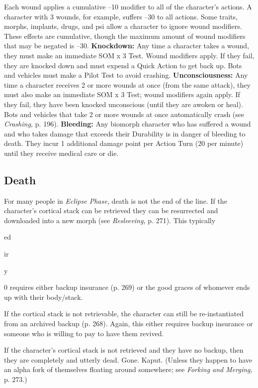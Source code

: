 Each wound applies a cumulative –10 modifier to all 
of the character's actions. A character with 3 wounds, 
for example, suffers –30 to all actions.
Some traits, morphs, implants, drugs, and psi allow 
a character to ignore wound modifiers. These effects 
are cumulative, though the maximum amount of 
wound modifiers that may be negated is –30.
\textbf{Knockdown:} Any time a character takes a wound, 
they must make an immediate SOM x 3 Test. Wound 
modifiers apply. If they fail, they are knocked down 
and must expend a Quick Action to get back up. Bots 
and vehicles must make a Pilot Test to avoid crashing.
\textbf{Unconsciousness:} Any time a character receives 2 
or more wounds at once (from the same attack), they 
must also make an immediate SOM x 3 Test; wound 
modifiers again apply. If they fail, they have been 
knocked unconscious (until they are awoken or heal). 
Bots and vehicles that take 2 or more wounds at once 
automatically crash (see \textit{Crashing,} p. 196).
\textbf{Bleeding:} Any biomorph character who has suffered 
a wound and who takes damage that exceeds their 
Durability is in danger of bleeding to death. They 
incur 1 additional damage point per Action Turn (20 
per minute) until they receive medical care or die.

\subsection{Death}

For many people in \textit{Eclipse Phase,} death is not the end 
of the line. If the character's cortical stack can be retrieved
they can be resurrected and downloaded into
a new morph (see \textit{Resleeving,} p. 271). This typically 

ed

ir 

y

0
requires either backup insurance (p. 269) or the good 
graces of whomever ends up with their body/stack.

If the cortical stack is not retrievable, the character can 
still be re-instantiated from an archived backup (p. 268). 
Again, this either requires backup insurance or someone 
who is willing to pay to have them revived.

If the character's cortical stack is not retrieved 
and they have no backup, then they are completely 
and utterly dead. Gone. Kaput. (Unless they happen 
to have an alpha fork of themselves floating around 
somewhere; see \textit{Forking and Merging,} p. 273.)

